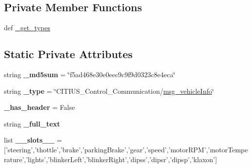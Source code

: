 \subsection*{\-Private \-Member \-Functions}
\begin{DoxyCompactItemize}
\item 
def \hyperlink{class_c_i_t_i_u_s___control___communication_1_1msg_1_1__msg__vehicle_info_1_1msg__vehicle_info_a1965a71a178c9d6f8c1816c66ca95a95}{\-\_\-get\-\_\-types}
\end{DoxyCompactItemize}
\subsection*{\-Static \-Private \-Attributes}
\begin{DoxyCompactItemize}
\item 
\hypertarget{class_c_i_t_i_u_s___control___communication_1_1msg_1_1__msg__vehicle_info_1_1msg__vehicle_info_a35abc4ef5b4827774fb0512be5c0736a}{string {\bfseries \-\_\-md5sum} = \char`\"{}f5ad468e30e0eec9c9f9d0323c8e4eca\char`\"{}}\label{class_c_i_t_i_u_s___control___communication_1_1msg_1_1__msg__vehicle_info_1_1msg__vehicle_info_a35abc4ef5b4827774fb0512be5c0736a}

\item 
\hypertarget{class_c_i_t_i_u_s___control___communication_1_1msg_1_1__msg__vehicle_info_1_1msg__vehicle_info_a29c3293f92833d336e1e7f234b4adbfc}{string {\bfseries \-\_\-type} = \char`\"{}\-C\-I\-T\-I\-U\-S\-\_\-\-Control\-\_\-\-Communication/\hyperlink{class_c_i_t_i_u_s___control___communication_1_1msg_1_1__msg__vehicle_info_1_1msg__vehicle_info}{msg\-\_\-vehicle\-Info}\char`\"{}}\label{class_c_i_t_i_u_s___control___communication_1_1msg_1_1__msg__vehicle_info_1_1msg__vehicle_info_a29c3293f92833d336e1e7f234b4adbfc}

\item 
\hypertarget{class_c_i_t_i_u_s___control___communication_1_1msg_1_1__msg__vehicle_info_1_1msg__vehicle_info_a3d86702b1d007198fe9ee9eb7589e654}{{\bfseries \-\_\-has\-\_\-header} = \-False}\label{class_c_i_t_i_u_s___control___communication_1_1msg_1_1__msg__vehicle_info_1_1msg__vehicle_info_a3d86702b1d007198fe9ee9eb7589e654}

\item 
string {\bfseries \-\_\-full\-\_\-text}
\item 
\hypertarget{class_c_i_t_i_u_s___control___communication_1_1msg_1_1__msg__vehicle_info_1_1msg__vehicle_info_afa5549dc0b0a6e501144236585ae7d7c}{list {\bfseries \-\_\-\-\_\-slots\-\_\-\-\_\-} = \mbox{[}'steering','thottle','brake','parking\-Brake','gear','speed','motor\-R\-P\-M','motor\-Temperature','lights','blinker\-Left','blinker\-Right','dipss','dipsr','dipsp','klaxon'\mbox{]}}\label{class_c_i_t_i_u_s___control___communication_1_1msg_1_1__msg__vehicle_info_1_1msg__vehicle_info_afa5549dc0b0a6e501144236585ae7d7c}


\end{DoxyCompactItemize}
